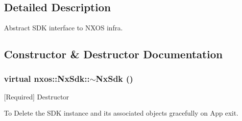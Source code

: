 \subsection{Detailed Description}
Abstract SDK interface to NXOS infra. 

\subsection{Constructor \& Destructor Documentation}
\hypertarget{classnxos_1_1NxSdk_a6b5028045019af4be6c8356ec0fdaff9}{
\subsubsection[{$\sim$NxSdk}]{\setlength{\rightskip}{0pt plus 5cm}virtual nxos::NxSdk::$\sim$NxSdk ()}}
\label{classnxos_1_1NxSdk_a6b5028045019af4be6c8356ec0fdaff9}
\mbox{[}Required\mbox{]} Destructor

To Delete the SDK instance and its associated objects gracefully on App exit. 


